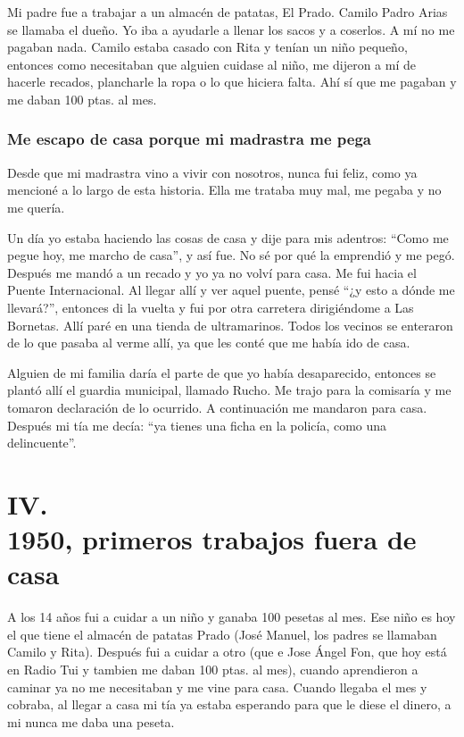 \documentclass[12pt,a5paper]{book}
\begin{document}
Mi padre fue a trabajar a un almacén de patatas, El Prado. Camilo Padro Arias se llamaba el dueño. Yo iba a ayudarle a llenar los sacos y a coserlos. A mí no me pagaban nada. Camilo estaba casado con Rita y tenían un niño pequeño, entonces como necesitaban que alguien cuidase al niño, me dijeron a mí de hacerle recados, plancharle la ropa o lo que hiciera falta. Ahí sí que me pagaban y me daban 100 ptas. al mes.


\subsubsection*{Me escapo de casa porque mi madrastra me pega}
Desde que mi madrastra vino a vivir con nosotros, nunca fui feliz, como ya mencioné a lo largo de esta historia. Ella me trataba muy mal, me pegaba y no me quería.

Un día yo estaba haciendo las cosas de casa y dije para mis adentros: “Como me pegue hoy, me marcho de casa”, y así fue. No sé por qué la emprendió y me pegó. Después me mandó a un recado y yo ya no volví para casa. Me fui hacia el Puente Internacional. Al llegar allí y ver aquel puente, pensé “¿y esto a dónde me llevará?”, entonces di la vuelta y fui por otra carretera dirigiéndome a Las Bornetas. Allí paré en una tienda de ultramarinos. Todos los vecinos se enteraron de lo que pasaba al verme allí, ya que les conté que me había ido de casa.

Alguien de mi familia daría el parte de que yo había desaparecido, entonces se plantó allí el guardia municipal, llamado Rucho. Me trajo para la comisaría y me tomaron declaración de lo ocurrido. A continuación me mandaron para casa. Después mi tía me decía: “ya tienes una ficha en la policía, como una delincuente”.



\section*{IV.\\1950, primeros trabajos fuera de casa}

A los 14 años fui a cuidar a un niño y ganaba 100 pesetas al mes. Ese niño es hoy el que tiene el almacén de patatas Prado (José Manuel, los padres se llamaban Camilo y Rita). Después fui a cuidar a otro (que e Jose Ángel Fon, que hoy está en Radio Tui y tambien me daban 100 ptas. al mes), cuando aprendieron a caminar ya no me necesitaban y me vine para casa. Cuando llegaba el mes y cobraba, al llegar a casa mi tía ya estaba esperando para que le diese el dinero, a mi nunca me daba una peseta.
\end{document}
